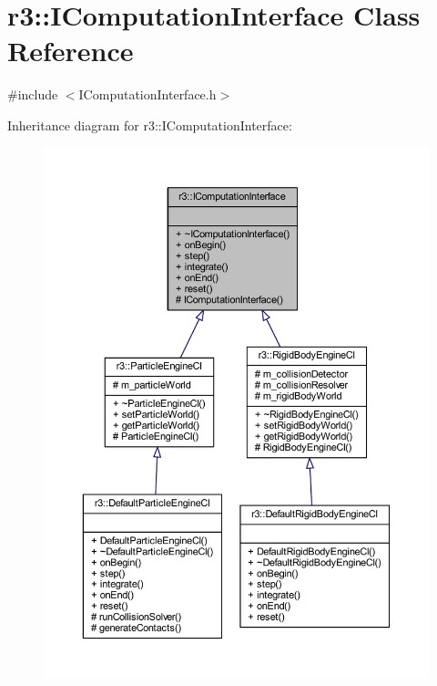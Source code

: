 \hypertarget{classr3_1_1_i_computation_interface}{}\section{r3\+:\+:I\+Computation\+Interface Class Reference}
\label{classr3_1_1_i_computation_interface}


{\ttfamily \#include $<$I\+Computation\+Interface.\+h$>$}



Inheritance diagram for r3\+:\+:I\+Computation\+Interface\+:\nopagebreak
\begin{figure}[H]
\begin{center}
\leavevmode
\includegraphics[width=350pt]{classr3_1_1_i_computation_interface__inherit__graph}
\end{center}
\end{figure}


